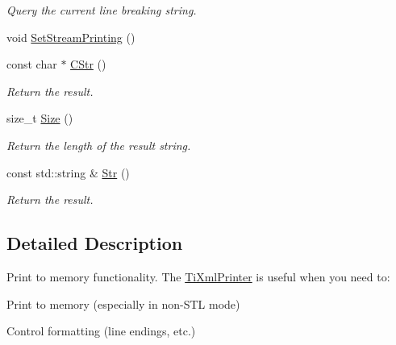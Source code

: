 \begin{DoxyCompactItemize}
\begin{DoxyCompactList}\small\item\em Query the current line breaking string. \end{DoxyCompactList}\item 
void \hyperlink{class_ti_xml_printer_ab23a90629e374cb1cadca090468bbd19}{Set\+Stream\+Printing} ()
\item 
\hypertarget{class_ti_xml_printer_a859eede9597d3e0355b77757be48735e}{const char $\ast$ \hyperlink{class_ti_xml_printer_a859eede9597d3e0355b77757be48735e}{C\+Str} ()}\label{class_ti_xml_printer_a859eede9597d3e0355b77757be48735e}

\begin{DoxyCompactList}\small\item\em Return the result. \end{DoxyCompactList}\item 
\hypertarget{class_ti_xml_printer_ad01375ae9199bd2f48252eaddce3039d}{size\+\_\+t \hyperlink{class_ti_xml_printer_ad01375ae9199bd2f48252eaddce3039d}{Size} ()}\label{class_ti_xml_printer_ad01375ae9199bd2f48252eaddce3039d}

\begin{DoxyCompactList}\small\item\em Return the length of the result string. \end{DoxyCompactList}\item 
\hypertarget{class_ti_xml_printer_a3bd4daf44309b41f5813a833caa0d1c9}{const std\+::string \& \hyperlink{class_ti_xml_printer_a3bd4daf44309b41f5813a833caa0d1c9}{Str} ()}\label{class_ti_xml_printer_a3bd4daf44309b41f5813a833caa0d1c9}

\begin{DoxyCompactList}\small\item\em Return the result. \end{DoxyCompactList}\end{DoxyCompactItemize}


\subsection{Detailed Description}
Print to memory functionality. The \hyperlink{class_ti_xml_printer}{Ti\+Xml\+Printer} is useful when you need to\+:


\begin{DoxyEnumerate}
\item Print to memory (especially in non-\/\+S\+T\+L mode)
\item Control formatting (line endings, etc.)
\end{DoxyEnumerate}

